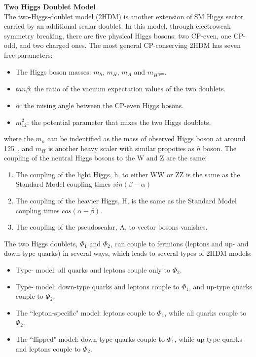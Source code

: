 \textbf{Two Higgs Doublet Model} \\
The two-Higgs-doublet model (2HDM) is another extension of SM Higgs sector carried by an additional scalar doublet.
In this model, through electroweak symmetry breaking, there are five physical Higgs bosons: two CP-even, one CP-odd, and two charged ones.
The most general CP-conserving 2HDM has seven free parameters:
\begin{itemize}
    \item The Higgs boson masses: $m_{h}$, $m_{H}$, $m_{A}$ and $m_{H^{/pm}}$.
    \item $tan \beta$: the ratio of the vacuum expectation values of the two doublets.
    \item $\alpha$: the mising angle between the CP-even Higgs bosons.
    \item $m_{12}^{2}$: the potential parameter that mixes the two Higgs doublets.
\end{itemize}
where the $m_{h}$ can be indentified as the mass of observed Higgs boson at around 125~\gev, and $m_{H}$ is another heavy scaler with similar propoties as $h$ boson.
The coupling of the neutral Higgs bosons to the W and Z are the same: 
\begin{enumerate}
    \item The coupling of the light Higgs, h, to either WW or ZZ is the same as the Standard Model coupling times $sin(\beta - \alpha)$ 
    \item The coupling of the heavier Higgs, H, is the same as the Standard Model coupling times $cos(\alpha - \beta)$.
    \item The coupling of the pseudoscalar, A, to vector bosons vanishes.
\end{enumerate}
The two Higgs doublets, $\Phi_{1}$ and $\Phi_{2}$, can couple to fermions (leptons and up- and down-type quarks) in several ways, which leads to several types of 2HDM models:
\begin{itemize}
    \item Type-\uppercase\expandafter{} model: all quarks and leptons couple only to $\Phi_{2}$.
    \item Type-\uppercase\expandafter{} model: down-type quarks and leptons couple to $\Phi_{1}$, and up-type quarks couple to $\Phi_{2}$.
    \item The ``lepton-specific" model: leptons couple to $\Phi_{1}$, while all quarks couple to $\Phi_{2}$.
    \item The ``flipped" model: down-type quarks couple to $\Phi_{1}$, while up-type quarks and leptons couple to $\Phi_{2}$.
\end{itemize}
